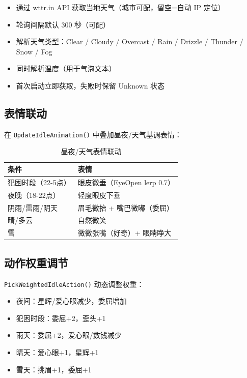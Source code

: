 \documentclass[12pt,a4paper]{ctexart}
\begin{document}
\begin{itemize}
    \item 通过 wttr.in API 获取当地天气（城市可配，留空=自动 IP 定位）
    \item 轮询间隔默认 300 秒（可配）
    \item 解析天气类型：Clear / Cloudy / Overcast / Rain / Drizzle / Thunder / Snow / Fog
    \item 同时解析温度（用于气泡文本）
    \item 首次启动立即获取，失败时保留 Unknown 状态
\end{itemize}

\subsection{表情联动}

在 \texttt{UpdateIdleAnimation()} 中叠加昼夜/天气基调表情：

\begin{table}[H]
\centering
\caption{昼夜/天气表情联动}
\label{tab:weather-emotion}
\begin{tabular}{ll}
\toprule
\textbf{条件} & \textbf{表情} \\
\midrule
犯困时段（22-5点） & 眼皮微垂（EyeOpen lerp 0.7） \\
夜晚（18-22点）    & 轻度眼皮下垂 \\
阴雨/雷雨/阴天    & 眉毛微抬 + 嘴巴微嘟（委屈） \\
晴/多云          & 自然微笑 \\
雪              & 微微张嘴（好奇）+ 眼睛睁大 \\
\bottomrule
\end{tabular}
\end{table}

\subsection{动作权重调节}

\texttt{PickWeightedIdleAction()} 动态调整权重：

\begin{itemize}
    \item 夜间：星辉/爱心眼减少，委屈增加
    \item 犯困时段：委屈+2，歪头+1
    \item 雨天：委屈+2，爱心眼/数钱减少
    \item 晴天：爱心眼+1，星辉+1
    \item 雪天：挑眉+1，委屈+1
\end{itemize}
\end{document}
